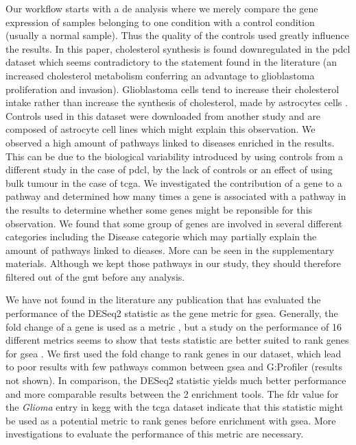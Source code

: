 Our workflow starts with a \acrlong{de} analysis where we merely compare the gene expression of samples belonging to one condition with a control condition (usually a normal sample).
Thus the quality of the controls used greatly influence the results.
In this paper, cholesterol synthesis is found downregulated in the \acrshort{pdcl} dataset which seems contradictory to the statement found in the literature (an increased cholesterol metabolism conferring an advantage to glioblastoma proliferation and invasion).
Glioblastoma cells tend to increase their cholesterol intake rather than increase the synthesis of cholesterol, made by astrocytes cells \cite*{Villa2016, Pirmoradi2019}.
Controls used in this dataset were downloaded from another study and are composed of astrocyte cell lines which might explain this observation.
We observed a high amount of pathways linked to diseases enriched in the results.
This can be due to the biological variability introduced by using controls from a different study in the case of \acrshort{pdcl}, by the lack of controls or an effect of using bulk tumour in the case of \acrshort{tcga}.
We investigated the contribution of a gene to a pathway and determined how many times a gene is associated with a pathway in the results to determine whether some genes might be reponsible for this observation.
We found that some group of genes are involved in several different categories including the Disease categorie which may partially explain the amount of pathways linked to dieases.
More can be seen in the supplementary materials.
Although we kept those pathways in our study, they should therefore filtered out of the \acrshort{gmt} before any analysis.

We have not found in the literature any publication that has evaluated the performance of the DESeq2 statistic as the gene metric for \acrshort{gsea}.
Generally, the fold change of a gene is used as a metric \cite*{Reimand2019}, but a study on the performance of 16 different metrics seems to show that tests statistic are better suited to rank genes for \acrshort{gsea} \cite*{Zyla2017}.
We first used the fold change to rank genes in our dataset, which lead to poor results with few pathways common between \acrshort{gsea} and G:Profiler (results not shown).
In comparison, the DESeq2 statistic yields much better performance and more comparable results between the 2 enrichment tools.
The \acrshort{fdr} value for the \textit{Glioma} entry in \acrshort{kegg} with the \acrshort{tcga} dataset indicate that this statistic might be used as a potential metric to rank genes before enrichment with \acrshort{gsea}.
More investigations to evaluate the performance of this metric are necessary.

